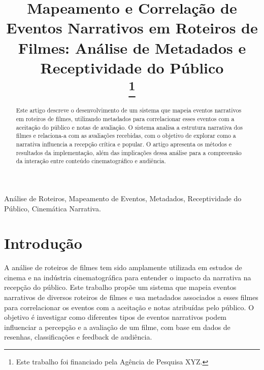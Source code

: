 \documentclass[conference]{IEEEtran}
\begin{document}
\title{Mapeamento e Correlação de Eventos Narrativos em Roteiros de Filmes: Análise de Metadados e Receptividade do Público\\
\thanks{Este trabalho foi financiado pela Agência de Pesquisa XYZ.}
}


\author{
}

\maketitle

\begin{abstract}
Este artigo descreve o desenvolvimento de um sistema que mapeia eventos narrativos em roteiros de filmes, utilizando metadados para correlacionar esses eventos com a aceitação do público e notas de avaliação. O sistema analisa a estrutura narrativa dos filmes e relaciona-a com as avaliações recebidas, com o objetivo de explorar como a narrativa influencia a recepção crítica e popular. O artigo apresenta os métodos e resultados da implementação, além das implicações dessa análise para a compreensão da interação entre conteúdo cinematográfico e audiência.
\end{abstract}

\begin{IEEEkeywords}
Análise de Roteiros, Mapeamento de Eventos, Metadados, Receptividade do Público, Cinemática Narrativa.
\end{IEEEkeywords}

\section{Introdução}
A análise de roteiros de filmes tem sido amplamente utilizada em estudos de cinema e na indústria cinematográfica para entender o impacto da narrativa na recepção do público. Este trabalho propõe um sistema que mapeia eventos narrativos de diversos roteiros de filmes e usa metadados associados a esses filmes para correlacionar os eventos com a aceitação e notas atribuídas pelo público. O objetivo é investigar como diferentes tipos de eventos narrativos podem influenciar a percepção e a avaliação de um filme, com base em dados de resenhas, classificações e feedback de audiência.
\end{document}
